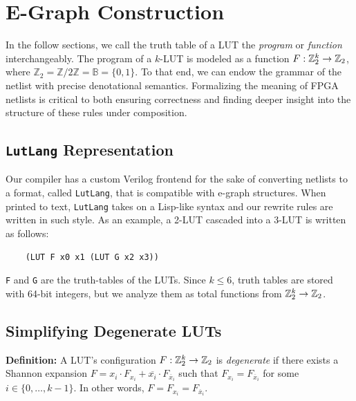 \section{E-Graph Construction}\label{sec:rewrites}

In the follow sections, we call the truth table of a LUT the \textit{program}
or \textit{function} interchangeably. The program of a $k$-LUT is modeled as a
function $F : \mathbb{Z}_{2}^{k} \rightarrow \mathbb{Z}_{2}$, where $\mathbb{Z}_2 = \mathbb{Z}/2\mathbb{Z}
    = \mathbb{B} = \{0,1\}$. To that end, we can endow the grammar of the netlist
with precise denotational semantics. Formalizing the meaning of FPGA netlists
is critical to both ensuring correctness and finding deeper insight into the
structure of these rules under composition.

\subsection{\texttt{LutLang} Representation}\label{sec:rewrites:lutlang}

Our compiler has a custom Verilog frontend for the sake of converting netlists
to a format, called \texttt{LutLang}, that is compatible with e-graph
structures. When printed to text, \texttt{LutLang} takes on a Lisp-like syntax
and our rewrite rules are written in such style. As an example, a 2-LUT
cascaded into a 3-LUT is written as follows:

\begin{verbatim}
    (LUT F x0 x1 (LUT G x2 x3))
\end{verbatim}

\texttt{F} and \texttt{G} are the truth-tables of the LUTs. Since $k \leq 6$, truth tables are stored with 64-bit integers, but we analyze them as total functions from $\mathbb{Z}_{2}^{k} \rightarrow \mathbb{Z}_{2}$.

\subsection{Simplifying Degenerate LUTs}\label{sec:rewrites:degen}

\textbf{Definition:} A LUT's configuration $F : \mathbb{Z}_{2}^{k} \rightarrow \mathbb{Z}_{2}$ is \textit{degenerate} if there exists a Shannon expansion $F = x_i \cdot F_{x_i} + \overline{x_i} \cdot F_{\overline{x}_i}$
such that $F_{x_i} = F_{\overline{x}_i}$ for some $i \in \{ 0, \ldots, k -1\}$. In other words, $F = F_{x_i} = F_{\overline{x}_i}$.

